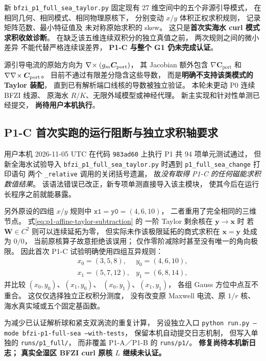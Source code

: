 新 \texttt{bfzi\_p1\_full\_sea\_taylor.py}
固定现有 27 维空间中的五个非源引导模式，
在相同几何、相同模式、相同物理原核下，
分别变动 $x/y$ 体积正权求积规则，
记录矩阵范数、最小特征值及
未对称原始求积的 skew。
这只是\textbf{首次实海水 curl 模式求积收敛诊断}。
在缺乏该五维连续双积分的独立真值之前，
两次规则之间的微小差异
不能代替严格连续误差界，
\textbf{P1-C 与整个 G1 仍未完成认证}。

源引导电流的原始方向为
$\nabla\!\times(g_m\bm C_{\mathrm{port}})$，
其 Jacobian 额外包含
$\nabla\bm C_{\mathrm{port}}$ 和
$\nabla\nabla\!\times\bm C_{\mathrm{port}}$。
目前不通过有限差分隐含这些导数，
而是\textbf{明确不支持该类模式的 Taylor 装配}，
直到已有解析端口线核的导数被独立验证。
本轮未更动 P0 连续 BFZI 线源、
原海水 $R/K$、无限外域模型或神经代理。
新主实现和针对性单测已经提交，
\textbf{尚待用户本机执行}。


\subsection{P1-C 首次实跑的运行阻断与独立求积轴要求}
用户本机 2026-11-05 UTC 在代码
\texttt{983ad60} 上执行 P1 共 94 项单元测试通过，
但新全海水试验导入
\texttt{bfzi\_p1\_full\_sea\_taylor.py}
时遇到 \texttt{p1\_full\_sea\_change} 打印语句
两个 \texttt{\_relative} 调用的关闭括号遗漏，
故\emph{没有取得 P1-C 的任何磁能求积数值结果}。
该语法错误已改正，新专项单测直接导入该主模块，
使其今后在运行长程序之前就能暴露。

另外原设的四组 $x/y$ 规则中
$\texttt{x1}=\texttt{y0}=(4,6,10)$，
二者重用了完全相同的三维节点。
式\eqref{eq:p1-affine-taylor-subtraction} 的
一阶 Taylor 剩余核在 $\bm y\to\bm x$ 时
若 $\bm W\in C^2$ 则可以连续延拓为零，
但实际未作该极限延拓的商式求积在
$\bm x=\bm y$ 处成为 $0/0$，
当前原核算子故意拒绝该误用；
仅作零阶减除时甚至没有唯一的角向极限。
因此首次 P1-C 试验明确使用四组互异规则：
\[
\begin{array}{ll}
x_0=(3,5,8),&y_0=(4,6,10),\\
x_1=(5,7,12),&y_1=(6,8,14),
\end{array}
\]
并比较 $(x_0,y_0)$、$(x_1,y_0)$、
$(x_0,y_1)$、$(x_1,y_1)$，
各组 Gauss 方位中点互不重合。
这仅仅选择独立正权积分测度，
没有改变原 Maxwell 电流、原 $1/r$ 核、
海水真实域或五个固定基函数。

为减少已认证解析球和紧支双涡流的重复计算，
另设独立入口
\texttt{python run.py --mode bfzi-p1-full-sea --with-tests}，
保留本机自动提交日志机制，
但写入单独的 \texttt{runs/p1\_full/}，
而非覆盖 P1-A／P1-B 的 \texttt{runs/p1/}。
\textbf{修复尚待本机新日志；
真实全湿区 BFZI curl 原核 $L$ 继续未认证。}

